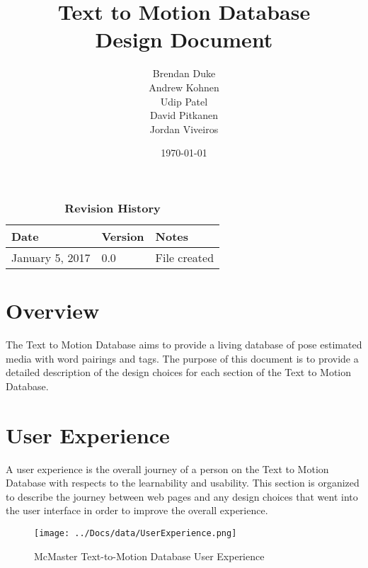 \documentclass{scrreprt}
\begin{document}
\title{\bf Text to Motion Database\\[\baselineskip]\Large Design Document}
\author{Brendan Duke\\Andrew Kohnen\\Udip Patel\\David Pitkanen\\Jordan Viveiros}
\date{\today}

\maketitle

\tableofcontents


\begin{table}[bp]
\caption*{\bf Revision History}
\begin{tabularx}{\textwidth}{p{3.5cm}p{2cm}X}
\toprule {\bf Date} & {\bf Version} & {\bf Notes}\\
\midrule
January 5, 2017 & 0.0 & File created\\
\bottomrule
\end{tabularx}
\end{table}

\newpage


\chapter{Overview}
The Text to Motion Database aims to provide a living database of pose estimated media with word pairings and tags. The purpose of this document is to provide a detailed description of the design choices for each section of the Text to Motion Database.

\chapter{User Experience}
A user experience is the overall journey of a person on the Text to Motion Database with respects to the learnability and usability. This section is organized to describe the journey between web pages and any design choices that went into the user interface in order to improve the overall experience.

\begin{figure}[!ht]
        \caption{McMaster Text-to-Motion Database User Experience}
        \label{userExp}
        \centering
        \texttt{[image: ../Docs/data/UserExperience.png]}
\end{figure}
\end{document}

